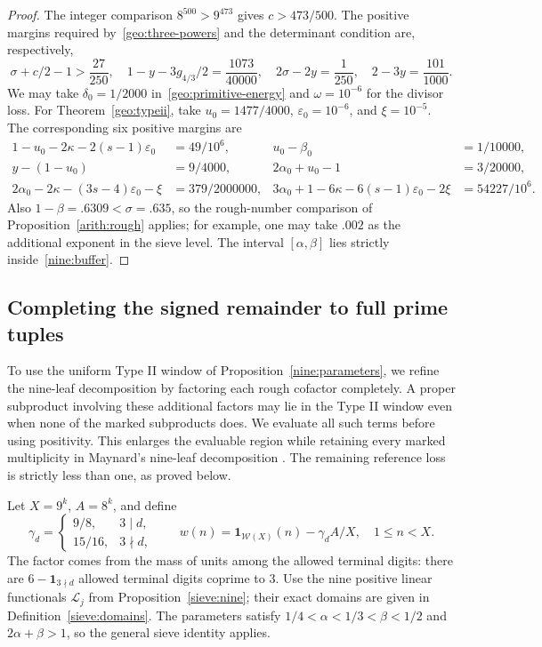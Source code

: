 \documentclass[11pt,a4paper]{article}
\theoremstyle{paperplain}
\numberwithin{equation}{section}
\begin{document}
\begin{proof}
The integer comparison $8^{500}>9^{473}$ gives $c>473/500$.
The positive margins required by~\eqref{geo:three-powers} and the determinant
condition are, respectively,
\[
 \sigma+c/2-1>\frac{27}{250},\quad
 1-y-3g_{4/3}/2=\frac{1073}{40000},\quad
 2\sigma-2y=\frac1{250},\quad 2-3y=\frac{101}{1000}.
\]
We may take $\delta_0=1/2000$ in~\eqref{geo:primitive-energy}
and $\omega=10^{-6}$ for the divisor loss.
For Theorem~\ref{geo:typeii}, take
$u_0=1477/4000$, $\varepsilon_0=10^{-6}$, and $\xi=10^{-5}$.
The corresponding six positive margins are
\begin{align*}
 1-u_0-2\kappa-2(s-1)\varepsilon_0&=49/10^6,&
 u_0-\beta_0&=1/10000,\\
 y-(1-u_0)&=9/4000,&
 2\alpha_0+u_0-1&=3/20000,\\
 2\alpha_0-2\kappa-(3s-4)\varepsilon_0-\xi&=379/2000000,&
 3\alpha_0+1-6\kappa-6(s-1)\varepsilon_0-2\xi&=54227/10^6.
\end{align*}
Also $1-\beta=.6309<\sigma=.635$, so the rough-number comparison of
Proposition~\ref{arith:rough} applies; for example, one may take $.002$ as the
additional exponent in the sieve level.
The interval $[\alpha,\beta]$ lies strictly inside~\eqref{nine:buffer}.
\end{proof}

\subsection{Completing the signed remainder to full prime tuples}

To use the uniform Type II window of Proposition~\ref{nine:parameters},
we refine the nine-leaf decomposition by factoring each rough cofactor
completely. A proper subproduct involving these additional factors may
lie in the Type II window even when none of the marked subproducts does.
We evaluate all such terms before using positivity. This enlarges the
evaluable region while retaining every marked multiplicity in Maynard's
nine-leaf decomposition \cite[Section 6]{Maynard2019}.
The remaining reference loss is strictly less than one, as proved below.

Let $X=9^k$, $A=8^k$, and define
\[
 \gamma_d=\begin{cases}9/8,&3\mid d,\\15/16,&3\nmid d,
 \end{cases}
 \qquad w(n)=\mathbf1_{\mathcal W(X)}(n)-\gamma_dA/X,
 \quad 1\le n<X.
\]
The factor comes from the mass of units among the allowed terminal digits:
there are $6-\mathbf1_{3\nmid d}$ allowed terminal digits coprime to $3$.
Use the nine positive linear functionals $\mathcal L_j$ from
Proposition~\ref{sieve:nine};
their exact domains are given in Definition~\ref{sieve:domains}.
The parameters satisfy
$1/4<\alpha<1/3<\beta<1/2$ and $2\alpha+\beta>1$,
so the general sieve identity applies.
\end{document}
